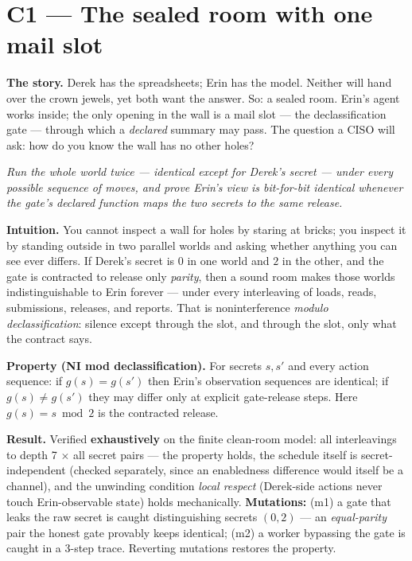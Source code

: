 \documentclass[11pt,a4paper]{article}
\newcommand{\onebreath}[1]{\begin{center}\emph{#1}\end{center}}
\begin{document}
\section{C1 --- The sealed room with one mail slot}
\textbf{The story.} Derek has the spreadsheets; Erin has the model. Neither will hand over the crown jewels, yet both want the answer. So: a sealed room. Erin's agent works inside; the only opening in the wall is a mail slot --- the declassification gate --- through which a \emph{declared} summary may pass. The question a CISO will ask: how do you know the wall has no other holes?

\onebreath{Run the whole world twice --- identical except for Derek's secret --- under \emph{every possible} sequence of moves, and prove Erin's view is bit-for-bit identical whenever the gate's declared function maps the two secrets to the same release.}

\textbf{Intuition.} You cannot inspect a wall for holes by staring at bricks; you inspect it by standing outside in two parallel worlds and asking whether anything you can see ever differs. If Derek's secret is $0$ in one world and $2$ in the other, and the gate is contracted to release only \emph{parity}, then a sound room makes those worlds indistinguishable to Erin forever --- under every interleaving of loads, reads, submissions, releases, and reports. That is noninterference \emph{modulo declassification}: silence except through the slot, and through the slot, only what the contract says.

\begin{thebox}
\textbf{Property (NI mod declassification).} For secrets $s,s'$ and every action sequence: if $g(s)=g(s')$ then Erin's observation sequences are identical; if $g(s)\neq g(s')$ they may differ only at explicit gate-release steps. Here $g(s)=s\bmod 2$ is the contracted release.

\textbf{Result.} Verified \textbf{exhaustively} on the finite clean-room model: all interleavings to depth 7 $\times$ all secret pairs --- the property holds, the schedule itself is secret-independent (checked separately, since an enabledness difference would itself be a channel), and the unwinding condition \emph{local respect} (Derek-side actions never touch Erin-observable state) holds mechanically. \textbf{Mutations:} (m1) a gate that leaks the raw secret is caught distinguishing secrets $(0,2)$ --- an \emph{equal-parity} pair the honest gate provably keeps identical; (m2) a worker bypassing the gate is caught in a 3-step trace. Reverting mutations restores the property.
\end{thebox}
\end{document}
